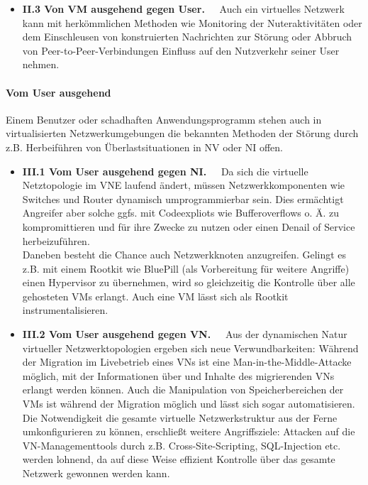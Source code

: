 \begin{itemize}
\item \textbf{II.3 Von VM ausgehend gegen User.~~}
Auch ein virtuelles Netzwerk kann mit herkömmlichen Methoden wie Monitoring der Nuteraktivitäten oder dem Einschleusen von konstruierten Nachrichten zur Störung oder Abbruch von Peer-to-Peer-Verbindungen Einfluss auf den Nutzverkehr seiner User nehmen.
\end{itemize}



\paragraph{Vom User ausgehend}
\label{parag:vonUser}
Einem Benutzer oder schadhaften Anwendungsprogramm stehen auch in virtualisierten Netzwerkumgebungen die bekannten Methoden der Störung durch z.B. Herbeiführen von Überlastsituationen in NV oder NI offen.

\begin{itemize}
	\item \textbf{III.1 Vom User ausgehend gegen NI.~~}
	Da sich die virtuelle Netztopologie im VNE laufend ändert, müssen Netzwerkkomponenten wie Switches und Router dynamisch umprogrammierbar sein. Dies ermächtigt Angreifer aber solche ggfs. mit Codeexpliots wie Bufferoverflows o. Ä. zu kompromittieren und für ihre Zwecke zu nutzen oder einen Denail of Service herbeizuführen.\\
	Daneben besteht die Chance auch Netzwerkknoten anzugreifen. Gelingt es z.B. mit einem Rootkit wie BluePill \cite{rutkowska2008bluepilling} (als Vorbereitung für weitere Angriffe) einen Hypervisor zu übernehmen, wird so gleichzeitig die Kontrolle über alle gehosteten VMs erlangt. Auch eine VM lässt sich als Rootkit instrumentalisieren.\cite{wu2010network}
	\item \textbf{III.2 Vom User ausgehend gegen VN.~~}
	Aus der dynamischen Natur virtueller Netzwerktopologien ergeben sich neue Verwundbarkeiten: Während der Migration im Livebetrieb eines VNs ist eine Man-in-the-Middle-Attacke möglich, mit der Informationen über und Inhalte des migrierenden VNs erlangt werden können. \cite{natarajansecurity} Auch die Manipulation von Speicherbereichen der VMs ist während der Migration möglich und lässt sich sogar automatisieren. \cite{oberheide2008empirical}\\
	Die Notwendigkeit die gesamte virtuelle Netzwerkstruktur aus der Ferne umkonfigurieren zu können, erschließt weitere Angriffsziele: Attacken auf die VN-Managementtools durch z.B. Cross-Site-Scripting, SQL-Injection etc. werden lohnend, da auf diese Weise effizient Kontrolle über das gesamte Netzwerk gewonnen werden kann.	
\end{itemize}



